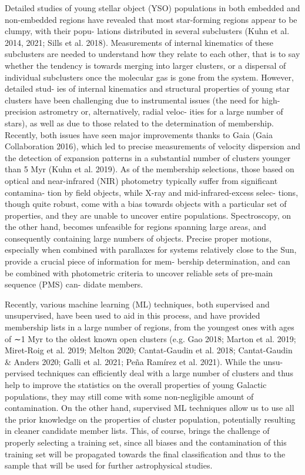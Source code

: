 \documentclass[../Main.tex]{subfiles}
\begin{document}
{Detailed studies of young stellar object (YSO) populations
in both embedded and non-embedded regions have revealed that
most star-forming regions appear to be clumpy, with their popu-
lations distributed in several subclusters (Kuhn et al. 2014, 2021;
Sills et al. 2018). Measurements of internal kinematics of these
subclusters are needed to understand how they relate to each
other, that is to say whether the tendency is towards merging into
larger clusters, or a dispersal of individual subclusters once the
molecular gas is gone from the system. However, detailed stud-
ies of internal kinematics and structural properties of young star
clusters have been challenging due to instrumental issues (the
need for high-precision astrometry or, alternatively, radial veloc-
ities for a large number of stars), as well as due to those related
to the determination of membership. Recently, both issues have
seen major improvements thanks to Gaia (Gaia Collaboration
2016), which led to precise measurements of velocity dispersion
and the detection of expansion patterns in a substantial number
of clusters younger than 5 Myr (Kuhn et al. 2019). As of the
membership selections, those based on optical and near-infrared
(NIR) photometry typically suﬀer from significant contamina-
tion by field objects, while X-ray and mid-infrared-excess selec-
tions, though quite robust, come with a bias towards objects with
a particular set of properties, and they are unable to uncover
entire populations. Spectroscopy, on the other hand, becomes
unfeasible for regions spanning large areas, and consequently
containing large numbers of objects. Precise proper motions,
especially when combined with parallaxes for systems relatively
close to the Sun, provide a crucial piece of information for mem-
bership determination, and can be combined with photometric
criteria to uncover reliable sets of pre-main sequence (PMS) can-
didate members.

Recently, various machine learning (ML) techniques,
both supervised and unsupervised, have been used to aid in
this process, and have provided membership lists in a large
number of regions, from the youngest ones with ages of
∼1 Myr to the oldest known open clusters (e.g. Gao 2018;
Marton et al. 2019; Miret-Roig et al. 2019; Melton 2020;
Cantat-Gaudin et al. 2018; Cantat-Gaudin & Anders 2020;
Galli et al. 2021; Peña Ramírez et al. 2021). While the unsu-
pervised techniques can eﬃciently deal with a large number of
clusters and thus help to improve the statistics on the overall
properties of young Galactic populations, they may still come
with some non-negligible amount of contamination. On the
other hand, supervised ML techniques allow us to use all
the prior knowledge on the properties of cluster population,
potentially resulting in cleaner candidate member lists. This,
of course, brings the challenge of properly selecting a training
set, since all biases and the contamination of this training
set will be propagated towards the final classification and thus to the sample that will be used for further astrophysical
studies.

}
\end{document}
